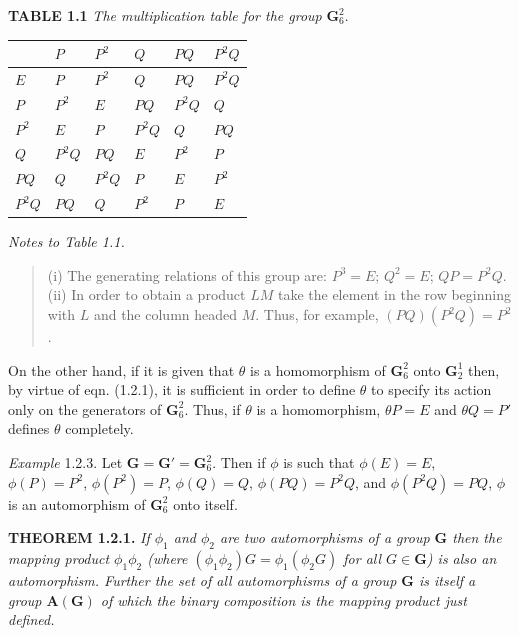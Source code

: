\documentclass[11pt,a4paper,twoside,openright]{book}
\begin{document}
\begin{minipage}{\textwidth}
\centering\textbf{TABLE 1.1}
\textit{The multiplication table for the group} $\mathbf{G}_6^2$.

\centering
\begin{tabular}{|l|l|l|l|l|l|}
\hline
 & $P$ & $P^{2}$ & $Q$ & $PQ$ & $P^{2}Q$ \\ \hline
$E$ & $P$ & $P^{2}$ & $Q$ & $PQ$ & $P^{2}Q$ \\ \hline
$P$ & $P^{2}$ & $E$ & $PQ$ & $P^{2}Q$ & $Q$ \\ \hline
$P^{2}$ & $E$ & $P$ & $P^{2}Q$ & $Q$ & $PQ$ \\ \hline
$Q$ & $P^{2}Q$ & $PQ$ & $E$ & $P^{2}$ & $P$ \\ \hline
$PQ$ & $Q$ & $P^{2}Q$ & $P$ & $E$ & $P^{2}$ \\ \hline
$P^{2}Q$ & $PQ$ & $Q$ & $P^{2}$ & $P$ & $E$ \\ \hline
\end{tabular}
\end{minipage}
\medskip

\textit{Notes to Table 1.1.}

\begin{quote}(i) The generating relations of this group are: $P^{3} = E$; $Q^{2} = E$; $QP = P^{2}Q$. (ii) In order to obtain a product $LM$ take the element in the row beginning with $L$ and the column headed $M$. Thus, for example, $(PQ)(P^{2}Q) = P^{2}$.\end{quote}

On the other hand, if it is given that $\theta$ is a homomorphism of $\mathbf{G}_6^2$ onto $\mathbf{G}_2^1$ then, by virtue of eqn. (1.2.1), it is sufficient in order to define $\theta$ to specify its action only on the generators of $\mathbf{G}_6^2$. Thus, if $\theta$ is a homomorphism, $\theta P = E$ and $\theta Q = P'$ defines $\theta$ completely.

\textit{Example} 1.2.3. Let $\mathbf{G} = \mathbf{G}' = \mathbf{G}_6^2$. Then if $\phi$ is such that $\phi(E) = E$, $\phi(P) = P^{2}$, $\phi(P^{2}) = P$, $\phi(Q) = Q$, $\phi(PQ) = P^{2}Q$, and $\phi(P^{2}Q) = PQ$, $\phi$ is an automorphism of $\mathbf{G}_6^2$ onto itself.

\textbf{THEOREM 1.2.1.} \textit{If $\phi_{1}$ and $\phi_{2}$ are two automorphisms of a group $\mathbf{G}$ then the mapping product $\phi_{1}\phi_{2}$ (where $(\phi_{1}\phi_{2})G = \phi_{1}(\phi_{2}G)$ for all $G \in \mathbf{G}$) is also an automorphism. Further the set of all automorphisms of a group $\mathbf{G}$ is itself a group $\mathbf{A}(\mathbf{G})$ of which the binary composition is the mapping product just defined.}
\end{document}
